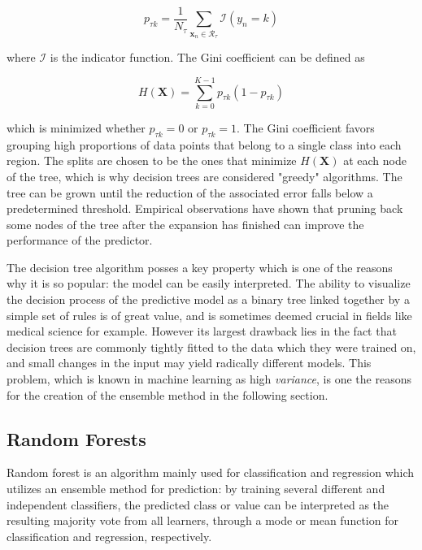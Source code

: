 \documentclass{kththesis}
\begin{document}
\begin{equation}
p_{\tau k} = \frac{1}{N_\tau} \sum_{\mathbf{x}_n \in \mathcal{R}_\tau} \mathcal{I}(y_n = k)
\end{equation}
 
 where $\mathcal{I}$ is the indicator function. The Gini coefficient can be defined as 
 
 \begin{equation}
 H(\mathbf{X}) = \sum_{k=0}^{K-1} p_{\tau k} (1-p_{\tau k})
 \end{equation}
 
which is minimized whether $p_{\tau k}=0$ or $p_{\tau k}=1$. The Gini coefficient favors grouping high proportions of data points that belong to a single class into each region. The splits are chosen to be the ones that minimize $H(\mathbf{X})$ at each node of the tree, which is why decision trees are considered "greedy" algorithms. The tree can be grown until the reduction of the associated error falls below a predetermined threshold. Empirical observations have shown that pruning back some nodes of the tree after the expansion has finished can improve the performance of the predictor.
 
The decision tree algorithm posses a key property which is one of the reasons why it is so popular: the model can be easily interpreted. The ability to visualize the decision process of the predictive model as a binary tree linked together by a simple set of rules is of great value, and is sometimes deemed crucial in fields like medical science for example. However its largest drawback lies in the fact that decision trees are commonly tightly fitted to the data which they were trained on, and small changes in the input may yield radically different models. This problem, which is known in machine learning as high \emph{variance}, is one the reasons for the creation of the ensemble method in the following section.
 
\subsection{Random Forests}

Random forest is an algorithm mainly used for classification and regression which utilizes an ensemble method for prediction: by training several different and independent classifiers, the predicted class or value can be interpreted as the resulting majority vote from all learners, through a mode or mean function for classification and regression, respectively.
\end{document}
